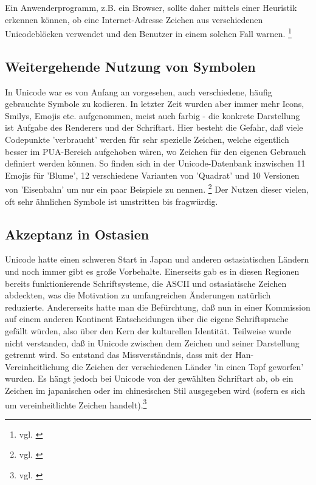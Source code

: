 Ein Anwenderprogramm, z.B. ein Browser, sollte daher mittels einer Heuristik erkennen können, ob eine Internet-Adresse Zeichen aus verschiedenen Unicodeblöcken verwendet und den Benutzer in einem solchen Fall warnen. \footnote{vgl. \cite{UC2014G}}

\subsection{Weitergehende Nutzung von Symbolen}
In Unicode war es von Anfang an vorgesehen, auch verschiedene, häufig gebrauchte Symbole zu kodieren.
In letzter Zeit wurden aber immer mehr Icons, Smilys, Emojis etc. aufgenommen, meist auch farbig - die konkrete Darstellung ist Aufgabe des Renderers und der Schriftart.
Hier besteht die Gefahr, daß viele Codepunkte 'verbraucht' werden für sehr spezielle Zeichen, welche eigentlich besser im PUA-Bereich aufgehoben wären, wo Zeichen für den eigenen Gebrauch definiert werden können.
So finden sich in der Unicode-Datenbank inzwischen 11 Emojis für 'Blume', 12 verschiedene Varianten von 'Quadrat' und 10 Versionen von 'Eisenbahn' um nur ein paar Beispiele zu nennen. \footnote{vgl. \cite{UC2014H}} 
Der Nutzen dieser vielen, oft sehr ähnlichen Symbole ist umstritten bis fragwürdig.

\subsection{Akzeptanz in Ostasien}
Unicode hatte einen schweren Start in Japan und anderen ostasiatischen Ländern und noch immer gibt es große Vorbehalte.
Einerseits gab es in diesen Regionen bereits funktionierende Schriftsysteme, die ASCII und ostasiatische Zeichen abdeckten, was die Motivation zu umfangreichen Änderungen natürlich reduzierte.
Andererseits hatte man die Befürchtung, daß nun in einer Kommission auf einem anderen Kontinent Entscheidungen über die eigene Schriftsprache gefällt würden, also über den Kern der kulturellen Identität. 
Teilweise wurde nicht verstanden, daß in Unicode zwischen dem Zeichen und seiner Darstellung getrennt wird. So entstand das Missverständnis, dass mit der Han-Vereinheitlichung die Zeichen der verschiedenen Länder 'in einen Topf geworfen' wurden. Es hängt jedoch bei Unicode von der gewählten Schriftart ab, ob ein Zeichen im japanischen oder im chinesischen Stil ausgegeben wird (sofern es sich um vereinheitlichte Zeichen handelt).\footnote{vgl. \cite{UC2014I}}


